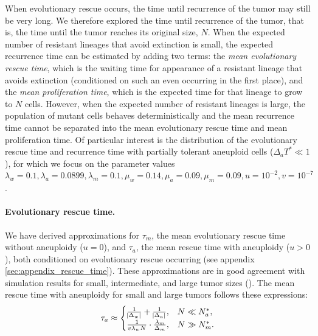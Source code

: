 \documentclass[12pt]{extarticle}
\begin{document}
When evolutionary rescue occurs, the time until recurrence of the tumor may still be very long. We therefore explored the time until recurrence of the tumor, that is, the time until the tumor reaches its original size, $N$.
When the expected number of resistant lineages that avoid extinction is small, the expected recurrence time can be estimated by adding two terms: the \emph{mean evolutionary rescue time}, which is the waiting time for appearance of a resistant lineage that avoids extinction (conditioned on such an even occurring in the first place), and the \emph{mean proliferation time}, which is the expected time for that lineage to grow to $N$ cells.
However, when the expected number of resistant lineages is large, the population of mutant cells behaves deterministically and the mean recurrence time cannot be separated into the mean evolutionary rescue time and mean proliferation time. %
Of particular interest is the distribution of the evolutionary rescue time and recurrence time with partially tolerant aneuploid cells ($\Delta_a T^*\ll1$), for which we focus on the parameter values  $\lambda_w=0.1, \lambda_a=0.0899,\lambda_m=0.1,\mu_w=0.14,\mu_a=0.09,\mu_m=0.09, u=10^{-2}, v=10^{-7}$ .

\paragraph{Evolutionary rescue time.}
We have derived approximations for $\tau_m$, the mean evolutionary rescue time without aneuploidy ($u=0$), and $\tau_a$, the mean rescue time with aneuploidy ($u>0$), both conditioned on evolutionary rescue occurring (see appendix \ref{sec:appendix_rescue_time}).
These approximations are in good agreement with simulation results for small, intermediate, and large tumor sizes ().
The mean rescue time with aneuploidy for small and large tumors follows these expressions:
\begin{equation}  \label{eq:AsymptoticTimeRules}
\tau_a \approx \begin{cases}
    \frac{1}{\abs{\Delta_w}}+\frac{1}{\abs{\Delta_a}} ,&
 N \ll N_a^* ,\\ 
  \frac{1}{v\lambda_w N} \cdot  \frac{\lambda_m}{\Delta_m} ,& %
  N \gg N_m^* .
  \end{cases}
\end{equation}
\end{document}
